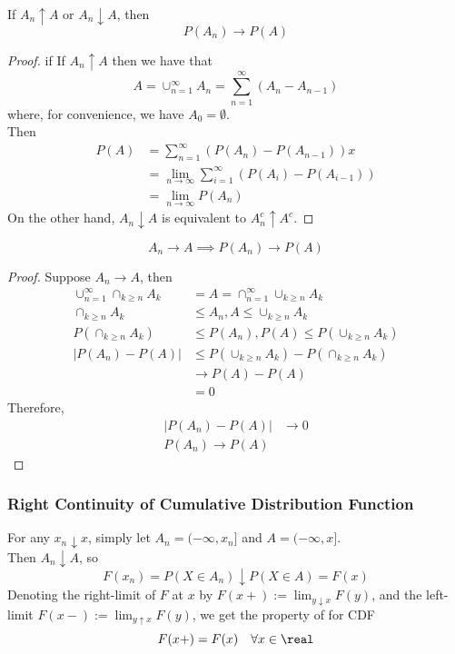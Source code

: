 \documentclass[11pt]{article}
\numberwithin{equation}{section}
\begin{document}
\proposition
If $A_n \uparrow A$ or $A_n \downarrow A$, then
$$P(A_n) \rightarrow P(A)$$
\begin{proof}
	if If $A_n \uparrow A$ then we have that 
	$$ A = \cup_{n=1}^\infty A_n = \sum_{n=1}^\infty (A_n - A_{n-1})$$
	where, for convenience, we have $A_0 = \emptyset$. \\
	Then
	\begin{align*}
		P(A) &= \sum_{n=1}^\infty (P(A_n) - P(A_{n-1}))x  \\
		&= \lim_{n \rightarrow \infty}\sum_{i=1}^\infty (P(A_i) - P(A_{i-1})) \\
		&= \lim_{n \rightarrow \infty} P(A_n)
	\end{align*}
	On the other hand, $A_n \downarrow A$ is equivalent to $A_n^c \uparrow A^c$.
\end{proof}

\begin{equation}
	A_n \rightarrow A \implies P(A_n) \rightarrow P(A)
\end{equation}
\begin{proof}
	Suppose $A_n \rightarrow A$, then
	\begin{align*}
		\cup_{n=1}^\infty\cap_{k\geq n}A_k &= A = \cap_{n=1}^\infty\cup_{k\geq n}A_k \\
		\cap_{k\geq n}A_k &\leq A_n, A \leq \cup_{k\geq n}A_k \\
		P(\cap_{k\geq n}A_k) &\leq P(A_n), P(A) \leq P(\cup_{k\geq n}A_k) \\
		|P(A_n) - P(A)| & \leq P(\cup_{k\geq n}A_k) - P(\cap_{k\geq n}A_k) \\
		& \rightarrow P(A) - P(A) \\
		&= 0
	\end{align*}
	Therefore, 
	\begin{align*}
		|P(A_n) - P(A)| &\rightarrow 0 \\
		P(A_n) \rightarrow P(A)
	\end{align*}
\end{proof}

\subsubsection{Right Continuity of Cumulative Distribution Function}
For any $x_n \downarrow x$, simply let $A_n = (-\infty, x_n]$ and $A=(-\infty, x]$. \\
Then $A_n \downarrow A$, so 
$$F(x_n) = P(X \in A_n) \downarrow P(X \in A) = F(x)$$
Denoting the right-limit of $F$ at $x$ by $F(x+) := \lim_{y\downarrow x}F(y)$, and the left-limit $F(x-) := \lim_{y\uparrow x}F(y)$, we get the property of  for CDF
\begin{equation}
	F(x+) = F(x) \quad \forall x \in \real
\end{equation}
\end{document}
